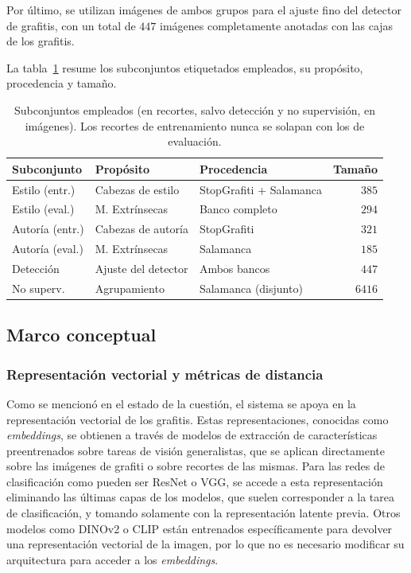 Por último, se utilizan imágenes de ambos grupos para el ajuste fino del
detector de grafitis, con un total de $447$ imágenes completamente anotadas con
las cajas de los grafitis.

La tabla~\ref{tab:subconjuntos} resume los subconjuntos etiquetados empleados,
su propósito, procedencia y tamaño.

\begin{table}[h!]
  \centering
  \begin{tabular}{|l|l|l|r|} \hline
    \textbf{Subconjunto} & \textbf{Propósito} & \textbf{Procedencia} & \textbf{Tamaño} \\ \hline
    Estilo (entr.) & Cabezas de estilo & StopGrafiti + Salamanca & $385$ \\ \hline
    Estilo (eval.) & M. Extrínsecas & Banco completo & $294$ \\ \hline
    Autoría (entr.) & Cabezas de autoría & StopGrafiti & $321$ \\ \hline
    Autoría (eval.) & M. Extrínsecas & Salamanca & $185$ \\ \hline
    Detección & Ajuste del detector & Ambos bancos & $447$ \\ \hline
    No superv. & Agrupamiento & Salamanca (disjunto) & $6416$ \\ \hline
  \end{tabular}
  \caption[Subconjuntos etiquetados empleados]{Subconjuntos empleados (en recortes, salvo detección y no
  supervisión, en imágenes). Los recortes de entrenamiento nunca se solapan con
  los de evaluación.}
  \label{tab:subconjuntos}
\end{table}

\subsection{Marco conceptual}
\label{subsec:conceptos}

\subsubsection{Representación vectorial y métricas de distancia}
\label{subsec:fundamentos}

Como se mencionó en el estado de la cuestión, el sistema se apoya en la
representación vectorial de los grafitis. Estas representaciones, conocidas
como \textit{embeddings}, se obtienen a través de modelos de extracción de
características preentrenados sobre tareas de visión generalistas, que se
aplican directamente sobre las imágenes de grafiti o sobre recortes de las
mismas. Para las redes de clasificación como pueden ser ResNet o VGG, se accede
a esta representación eliminando las últimas capas de los modelos, que suelen
corresponder a la tarea de clasificación, y tomando solamente con la
representación latente previa. Otros modelos como DINOv2 o CLIP están
entrenados específicamente para devolver una representación vectorial de la
imagen, por lo que no es necesario modificar su arquitectura para acceder a los
\textit{embeddings}.


